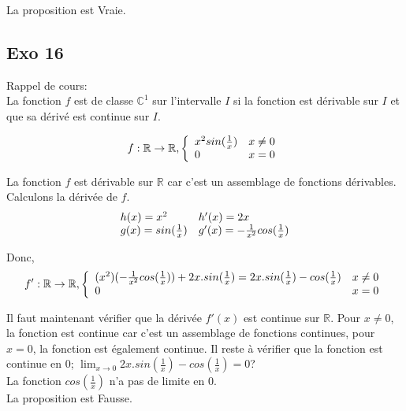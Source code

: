 \documentclass[]{book}
\theoremstyle{definition}
\newcommand{\bb}[1]{\mathbb{#1}}
\newcommand{\R}{\bb{R}}
\newcommand{\C}{\bb{C}}
\begin{document}
La proposition est Vraie.


\subsection*{Exo 16}
Rappel de cours:\\
La fonction $f$ est de classe $\C^1$ sur l'intervalle $I$ si la fonction est d\'erivable sur $I$ et que sa d\'eriv\'e est continue sur $I$.

$$f: \R \to \R,
\left\{ 
\begin{array}{l l}
 x^2sin(\frac{1}{x}) & x \neq 0\\
 0 & x = 0\\
\end{array}
\right. 
$$

La fonction $f$ est d\'erivable sur $\R$ car c'est un assemblage de fonctions d\'erivables. Calculons la d\'eriv\'ee de $f$.
$$
\begin{array}{l l}
 h(x) = x^2 & h'(x)= 2x\\
 g(x) = sin(\frac{1}{x}) & g'(x)= -\frac{1}{x^2}cos(\frac{1}{x})\\
\end{array}
$$

Donc,
$$f': \R \to \R,
\left\{ 
\begin{array}{l l}
 (x^2)(-\frac{1}{x^2}cos(\frac{1}{x})) + 2x.sin(\frac{1}{x}) = 2x.sin(\frac{1}{x}) - cos(\frac{1}{x})& x \neq 0\\
 0 & x = 0\\
\end{array}
\right. 
$$

Il faut maintenant v\'erifier que la d\'eriv\'ee $f'(x)$ est continue sur $\R$. Pour $x \neq 0$, la fonction est continue car c'est un assemblage de fonctions continues, pour $x=0$, la fonction est \'egalement continue. Il reste \`a v\'erifier que la fonction est continue en $0$; $\lim_{x \to 0} 2x.sin(\frac{1}{x}) - cos(\frac{1}{x}) = 0$?\\

La fonction $cos(\frac{1}{x})$ n'a pas de limite en $0$.\\

La proposition est Fausse.
\end{document}
